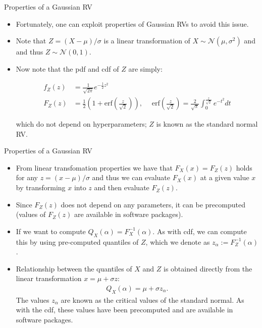 \documentclass[9pt]{beamer}
\begin{document}
%
\begin{frame}{Properties of a Gaussian RV}

\begin{itemize}
\item Fortunately, one can exploit properties of Gaussian RVs to avoid this issue. 

\item Note that $Z=(X-\mu)/\sigma$ is a linear transformation of $X\sim \mathcal{N}(\mu,\sigma^2)$ and and thus $Z\sim \mathcal{N}(0,1)$. 

\item Now note that the pdf and cdf of $Z$ are simply:
\begin{block}{}
\begin{align*}
f_Z(z)&=\frac{1}{\sqrt{2\pi}}e^{-\frac{1}{2}z^2}\\
F_Z\left(z\right)&=\frac{1}{2}\left(1+\textrm{erf}\left(\frac{z}{\sqrt{2}}\right)\right),\; \quad \textrm{erf}\left(\frac{z}{\sqrt{2}}\right)=\frac{2}{\sqrt{\pi}}\int_0^{\frac{z}{\sqrt{2}}}e^{-t^2}dt
\end{align*}
\end{block}
which do not depend on hyperparameters; $Z$ is known as the standard normal RV. 
\end{itemize}

\end{frame}


%
\begin{frame}{Properties of a Gaussian RV}

\begin{itemize}
\item From linear transfomation properties we have that $F_X(x)=F_Z(z)$ holds for any $z=(x-\mu)/\sigma$ and thus we can evaluate $F_X(x)$ at a given value $x$ by transforming $x$ into $z$ and then evaluate $F_Z(z)$. 

\item Since $F_Z(z)$ does not depend on any parameters, it can be precomputed (values of $F_Z(z)$ are available in software packages). 

\item If we want to compute $Q_X(\alpha)=F^{-1}_X(\alpha)$. As with cdf, we can compute this by using pre-computed quantiles of $Z$, which we denote as $z_\alpha:=F_Z^{-1}(\alpha)$. 

\item Relationship between the quantiles of $X$ and $Z$ is obtained directly from the linear transformation $x=\mu+\sigma z$:
\begin{align*}
Q_X(\alpha)=\mu+\sigma z_\alpha.
\end{align*}
The values $z_\alpha$ are known as the critical values of the standard normal. As with the cdf, these values have been precomputed and are available in software packages. 
\end{itemize}

\end{frame}
\end{document}

